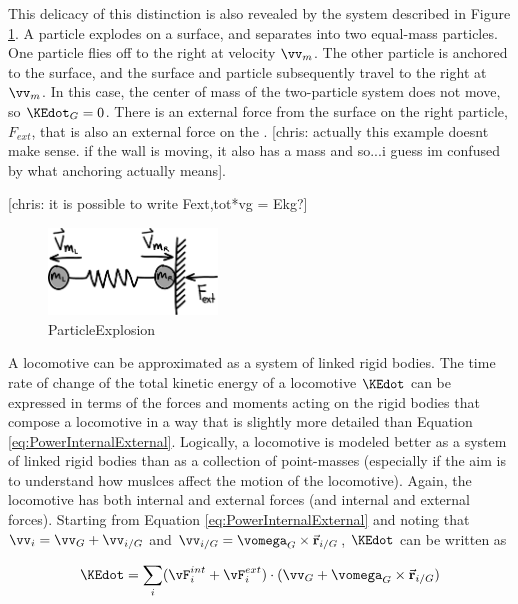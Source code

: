 This delicacy of this distinction is also revealed by the system described in Figure \ref{fig:ParticleExplosion}. A particle explodes on a surface, and separates into two equal-mass particles. One particle flies off to the right at velocity $\vv_m$. The other particle is anchored to the surface, and the surface and particle subsequently travel to the right at $\vv_m$. In this case, the center of mass of the two-particle system does not move, so $\KEdot_{G} = 0$. There is an external force from the surface on the right particle, $F_{ext}$, that is also an external force on the . [chris: actually this example doesnt make sense. if the wall is moving, it also has a mass and so...i guess im confused by what anchoring actually means].

[chris: it is possible to write Fext,tot*vg = Ekg?]


\begin{figure}[h]		%
\begin{centering}
\includegraphics[width=0.4\textwidth]{Figures/ParticleExplosion}\par
\end{centering}
\caption{ParticleExplosion}
\label{fig:ParticleExplosion}
\end{figure}
%

A locomotive can be approximated as a system of linked rigid bodies. The time rate of change of the total kinetic energy of a locomotive $\KEdot$ can be expressed in terms of the forces and moments acting on the rigid bodies that compose a locomotive in a way that is slightly more detailed than Equation \ref{eq:PowerInternalExternal}. Logically, a locomotive is modeled better as a system of linked rigid bodies than as a collection of point-masses (especially if the aim is to understand how muslces affect the motion of the locomotive). Again, the locomotive has both internal and external forces (and internal and external forces). Starting from Equation \ref{eq:PowerInternalExternal} and noting that $\vv_i = \vv_{G} + \vv_{i/G}$ and $\vv_{i/G} = \vomega_{G} \times \vec{\mathbf{r}}_{i/G}$, $\KEdot$ can be written as 

\begin{equation}
\KEdot = \sum_{i} (\vF_{i}^{int} + \vF_{i}^{ext} ) \cdot ( \vv_{G} + \vomega_{G} \times \vec{\mathbf{r}}_{i/G})
\end{equation}

